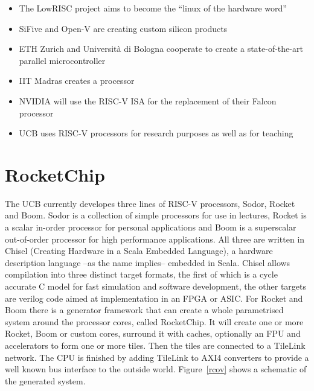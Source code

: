 \documentclass[journal,a4paper]{IEEEtran}
\def\CC/{C\nolinebreak\hspace{-.05em}\raisebox{.4ex}{\tiny\textbf{+}}\nolinebreak\hspace{-.03em}\raisebox{.4ex}{\tiny\textbf{+}}}
\begin{document}
\begin{itemize}
	\item The LowRISC project aims to become the ``linux of the hardware word''
	\item SiFive and Open-V are creating custom silicon products
	\item ETH Zurich and Università di Bologna cooperate to create a state-of-the-art parallel microcontroller
	\item IIT Madras creates a processor
	\item NVIDIA will use the RISC-V ISA for the replacement of their Falcon processor
	\item UCB uses RISC-V processors for research purposes as well as for teaching
\end{itemize}


\section{RocketChip}
The UCB currently developes three lines of RISC-V processors, Sodor, Rocket and Boom.
Sodor is a collection of simple processors for use in lectures, Rocket is a scalar in-order processor for personal applications and Boom is a superscalar out-of-order processor for high performance applications.
All three are written in Chisel (Creating Hardware in a Scala Embedded Language), a hardware description language --as the name implies-- embedded in Scala.
Chisel allows compilation into three distinct target formats, the first of which is a cycle accurate \CC/ model for fast simulation and software development, the other targets are verilog code aimed at implementation in an FPGA or ASIC\@.
For Rocket and Boom there is a generator framework that can create a whole parametrised system around the processor cores, called RocketChip.
It will create one or more Rocket, Boom or custom cores, surround it with caches, optionally an FPU and accelerators to form one or more tiles. Then the tiles are connected to a TileLink network. The CPU is finished by adding TileLink to AXI4 converters to provide a well known bus interface to the outside world. Figure~\ref{rcov} shows a schematic of the generated system.

\end{document}
